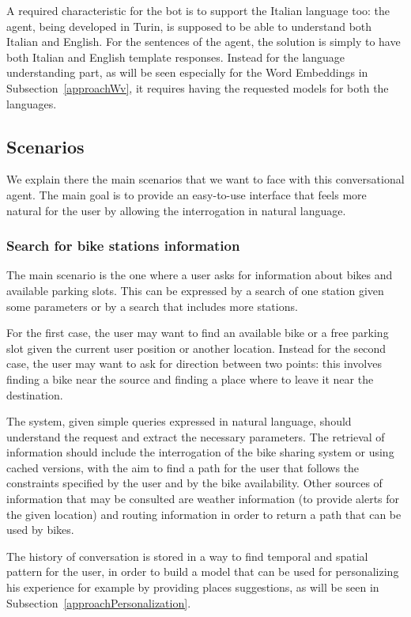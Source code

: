 A required characteristic for the bot is to support the Italian language too: the agent, being developed in Turin, is supposed to be able to understand both Italian and English. For the sentences of the agent, the solution is simply to have both Italian and English template responses. Instead for the language understanding part, as will be seen especially for the Word Embeddings in Subsection~\ref{approachWv}, it requires having the requested models for both the languages.

\subsection{Scenarios}
\label{approachScenarios}

We explain there the main scenarios that we want to face with this conversational agent. The main goal is to provide an easy-to-use interface that feels more natural for the user by allowing the interrogation in natural language.

\subsubsection{Search for bike stations information}
The main scenario is the one where a user asks for information about bikes and available parking slots. This can be expressed by a search of one station given some parameters or by a search that includes more stations.

For the first case, the user may want to find an available bike or a free parking slot given the current user position or another location. Instead for the second case, the user may want to ask for direction between two points: this involves finding a bike near the source and finding a place where to leave it near the destination.

The system, given simple queries expressed in natural language, should understand the request and extract the necessary parameters. The retrieval of information should include the interrogation of the bike sharing system or using cached versions, with the aim to find a path for the user that follows the constraints specified by the user and by the bike availability. Other sources of information that may be consulted are weather information (to provide alerts for the given location) and routing information in order to return a path that can be used by bikes.

The history of conversation is stored in a way to find temporal and spatial pattern for the user, in order to build a model that can be used for personalizing his experience for example by providing places suggestions, as will be seen in Subsection~\ref{approachPersonalization}.

